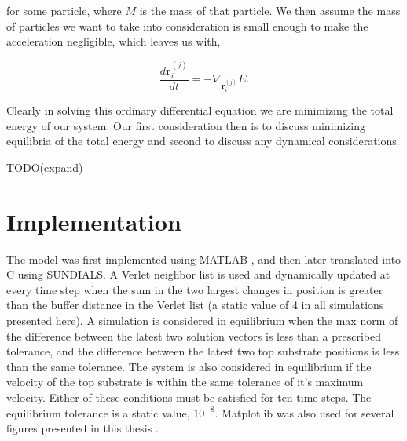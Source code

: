 	for some particle, where $M$ is the mass of that particle. We then assume the mass of particles we want to take into consideration is small enough to make the acceleration negligible, which leaves us with,
	
\begin{equation}
	 \frac{d\textbf{r}_i^{(j)}}{dt} = -\nabla_{\textbf{r}_i^{(j)}}E.
\end{equation}

Clearly in solving this ordinary differential equation we are minimizing the total energy of our system. Our first consideration then is to discuss minimizing equilibria of the total energy and second to discuss any dynamical considerations.

TODO(expand)

\section{Implementation}

	The model was first implemented using MATLAB \cite{MATLAB2010}, and then later translated into C using SUNDIALS\cite{sundials}. A Verlet neighbor list is used and dynamically updated at every time step when the sum in the two largest changes in position is greater than the buffer distance in the Verlet list (a static value of 4 in all simulations presented here). A simulation is considered in equilibrium when the max norm of the difference between the latest two solution vectors is less than a prescribed tolerance, and the difference between the latest two top substrate positions is less than the same tolerance. The system is also considered in equilibrium if the velocity of the top substrate is within the same tolerance of it's maximum velocity. Either of these conditions must be satisfied for ten time steps. The equilibrium tolerance is a static value, $10^{-8}$. Matplotlib was also used for several figures presented in this thesis \cite{Hunter2007}.







